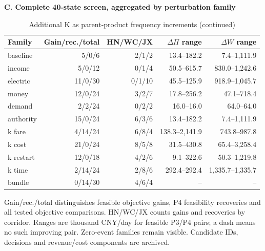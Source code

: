 \begin{table}[htbp]\centering
\ContinuedFloat
\caption{Additional K as parent-product frequency increments (continued)}
\begin{minipage}{.95\textwidth}\fontsize{8}{10}\selectfont{}\setlength{\tabcolsep}{2pt}\renewcommand{\arraystretch}{1.08}
\par\noindent\textbf{C. Complete 40-state screen, aggregated by perturbation family}\par\smallskip
\begin{tabular*}{\linewidth}{@{\extracolsep{\fill}}>{\raggedright\arraybackslash}p{.24\linewidth}rrrr@{}}\toprule
Family & Gain/rec./total & HN/WC/JX & $\Delta\Pi$ range & $\Delta W$ range \\
\midrule
baseline & 5/0/6 & 2/1/2 & 13.4--182.2 & 7.4--1,111.9 \\
income & 5/0/12 & 0/1/4 & 50.5--615.7 & 830.0--1,242.6 \\
electric & 11/0/30 & 0/1/10 & 45.5--125.9 & 918.9--1,045.7 \\
money & 12/0/24 & 3/2/7 & 17.8--256.2 & 47.1--718.4 \\
demand & 2/2/24 & 0/2/2 & 16.0--16.0 & 64.0--64.0 \\
authority & 15/0/24 & 6/3/6 & 13.4--182.2 & 7.4--1,111.9 \\
k fare & 4/14/24 & 6/8/4 & 138.3--2,141.9 & 743.8--987.8 \\
k cost & 21/0/24 & 8/5/8 & 31.5--430.8 & 65.4--3,258.4 \\
k restart & 12/0/18 & 4/2/6 & 9.1--322.6 & 50.3--1,219.8 \\
k time & 2/14/24 & 2/8/6 & 292.4--292.4 & 1,335.7--1,335.7 \\
bundle & 0/14/30 & 4/6/4 & -- & -- \\
\bottomrule\end{tabular*}\par\medskip
\par\noindent\fontsize{8}{9.5}\selectfont Gain/rec./total distinguishes feasible objective gains, P4 feasibility recoveries and all tested objective comparisons. HN/WC/JX counts gains and recoveries by corridor. Ranges are thousand CNY/day for feasible P3/P4 pairs; a dash means no such improving pair. Zero-event families remain visible. Candidate IDs, decisions and revenue/cost components are archived.
\end{minipage}\end{table}
